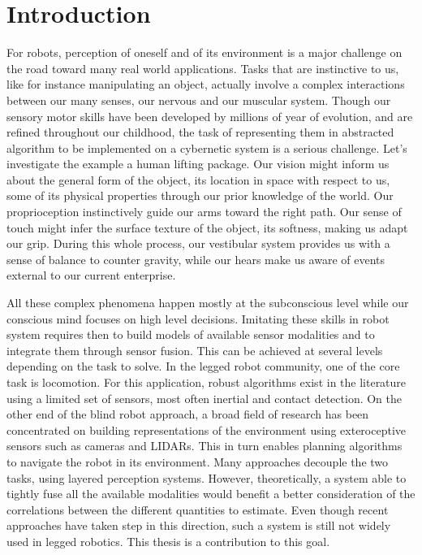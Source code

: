 \chapter{Introduction}


For robots, perception of oneself and of its environment is a major challenge on the road toward many real world applications. 
Tasks that are instinctive to us, like for instance manipulating an object, actually involve a complex 
interactions between our many senses, our nervous and our muscular system.
Though our sensory motor skills have been developed by millions of year of evolution, and are refined throughout our childhood,
the task of representing them in abstracted algorithm to be implemented on a cybernetic system is a serious challenge. 
Let's investigate the example a human lifting package. Our vision might inform us about the general form of the object, 
its location in space with respect to us, some of its physical properties through our prior knowledge of the world. Our proprioception 
instinctively guide our arms toward the right path. Our sense of touch might infer the surface texture of the object, 
its softness, making us adapt our grip. During this whole process, our vestibular system
provides us with a sense of balance to counter gravity, while our hears make us aware of events external to our current enterprise.

All these complex phenomena happen mostly at the subconscious level while our conscious mind focuses on high level decisions.
Imitating these skills in robot system requires then to build models of available sensor modalities and to integrate them through sensor
fusion. This can be achieved at several levels depending on the task to solve. In the legged robot community, one of the core task is locomotion.
For this application, robust algorithms exist in the literature using a limited set of sensors, most often inertial and contact detection.
On the other end of the blind robot approach, a broad field of research has been concentrated on building representations of the environment 
using exteroceptive sensors such as cameras and LIDARs. This in turn enables planning algorithms to navigate the robot in its environment. 
Many approaches decouple the two tasks, using layered perception systems. However, theoretically, a system able to tightly fuse all the 
available modalities would benefit a better consideration of the correlations between the different quantities to estimate. 
Even though recent approaches have taken step in this direction, such a system is still not widely used in legged robotics. 
This thesis is a contribution to this goal. 


